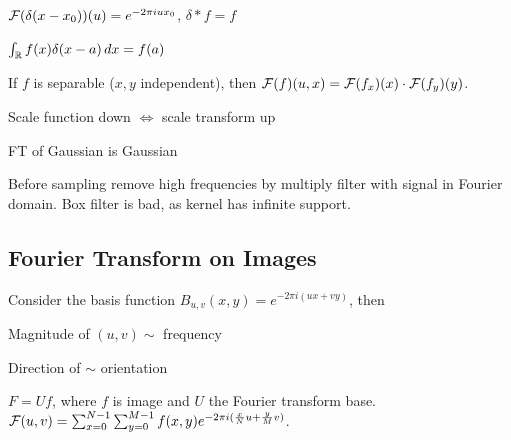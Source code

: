 \begin{definition}
  \(\operatorname{\mathcal{F}}(\delta(x - x_0))(u) = e^{-2\pi i u x_0}\), \(\delta \ast f = f\)
\end{definition}

\begin{definition}
  \(\int_{\operatorname{\mathbb{R}}} f(x)\delta(x - a) \,dx = f(a)\)
\end{definition}

\begin{definition}
  If \(f\) is separable (\(x, y\) independent), then \(\operatorname{\mathcal{F}}(f)(u, x) = \operatorname{\mathcal{F}}(f_x)(x) \cdot \operatorname{\mathcal{F}}(f_y)(y)\).
\end{definition}

\begin{definition}
\end{definition}

\begin{definition}
  Scale function down \(\iff\) scale transform up
\end{definition}

\begin{definition}[Gaussian]
  FT of Gaussian is Gaussian
\end{definition}

\begin{definition}[Smoothing]
  Before sampling remove high frequencies by multiply filter with signal in Fourier domain.
  Box filter is bad, as kernel has infinite support.
\end{definition}

\subsection{Fourier Transform on Images}

Consider the basis function \(B_{u,v}(x, y) = e^{-2\pi i(ux + vy)}\), then

\begin{itemize*}
  \item Magnitude of \((u, v) \sim\) frequency
  \item Direction of \(\sim\) orientation
\end{itemize*}

\begin{definition}[FT on Images]
 \(F = Uf\), where \(f\) is image and \(U\) the Fourier transform base.
 \(\operatorname{\mathcal{F}}(u,v) = \sum_{x = 0}^{N - 1}\sum_{y = 0}^{M - 1} f(x, y) e^{-2\pi i (\frac{x}{N}u + \frac{y}{M}v)}\).
\end{definition}

